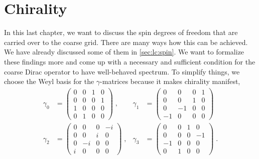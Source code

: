 \chapter{Chirality}
\label{ch:p2:chirality}





In this last chapter, we want to discuss the spin degrees of freedom that are carried over to the coarse grid.
There are many ways how this can be achieved.
We have already discussed some of them in \cref{sec:lc:spin}.
We want to formalize these findings more and come up with a necessary and sufficient condition for the coarse Dirac operator to have well-behaved spectrum.
To simplify things, we choose the Weyl basis for the $\gamma$-matrices because it makes chirality manifest,
\begin{align} \label{eq:gamma:weyl:basis}
\gamma_0 &=
\begin{pmatrix}
0 & 0 & 1 & 0 \\
0 & 0 & 0 & 1 \\
1 & 0 & 0 & 0 \\
0 & 1 & 0 & 0
\end{pmatrix} \;,
&
\gamma_1 &=
\begin{pmatrix}
0 & 0 & 0 & 1 \\
0 & 0 & 1 & 0 \\
0 & -1 & 0 & 0 \\
-1 & 0 & 0 & 0
\end{pmatrix} \\
\gamma_2 &=
\begin{pmatrix}
0 & 0 & 0 & -i \\
0 & 0 & i & 0 \\
0 & -i & 0 & 0 \\
i & 0 & 0 & 0
\end{pmatrix} \;,
&
\gamma_3 &=
\begin{pmatrix}
0 & 0 & 1 & 0 \\
0 & 0 & 0 & -1 \\
-1 & 0 & 0 & 0 \\
0 & 1 & 0 & 0
\end{pmatrix} \;.
\end{align}

